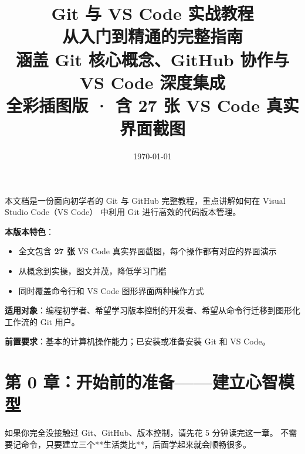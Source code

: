 \documentclass[12pt,a4paper,openany]{ctexbook}
\title{%
  \vspace{-2cm}
  {\Huge\bfseries Git 与 VS Code 实战教程}\\[0.5cm]
  {\LARGE 从入门到精通的完整指南}\\[1cm]
  {\large 涵盖 Git 核心概念、GitHub 协作与 VS Code 深度集成}\\[0.3cm]
  {\normalsize\color{gray} 全彩插图版 · 含 27 张 VS Code 真实界面截图}
}
\author{}
\date{\today}
\begin{document}
\maketitle
\thispagestyle{empty}

\vspace{2cm}
\begin{center}
\begin{tcolorbox}[
  colback=gray!5!white,
  colframe=gray!50!black,
  title={\faBook\; 关于本文档},
  fonttitle=\bfseries\large
]
本文档是一份面向初学者的 Git 与 GitHub 完整教程，重点讲解如何在 Visual Studio Code（VS Code）
中利用 Git 进行高效的代码版本管理。

\textbf{本版本特色}：
\begin{itemize}
  \item 全文包含 \textbf{27 张} VS Code 真实界面截图，每个操作都有对应的界面演示
  \item 从概念到实操，图文并茂，降低学习门槛
  \item 同时覆盖命令行和 VS Code 图形界面两种操作方式
\end{itemize}

\vspace{0.5em}
\textbf{适用对象}：编程初学者、希望学习版本控制的开发者、希望从命令行迁移到图形化工作流的 Git 用户。

\vspace{0.5em}
\textbf{前置要求}：基本的计算机操作能力；已安装或准备安装 Git 和 VS Code。
\end{tcolorbox}
\end{center}

\clearpage

\tableofcontents
\clearpage

\chapter*{第 0 章：开始前的准备——建立心智模型}


如果你完全没接触过 Git、GitHub、版本控制，请先花 5 分钟读完这一章。
不需要记命令，只要建立三个**生活类比**，后面学起来就会顺畅很多。
\end{document}
